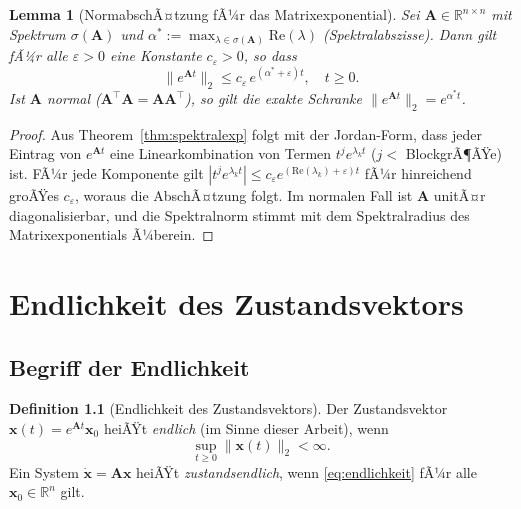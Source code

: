 ﻿\documentclass[12pt, a4paper, titlepage]{report}
\newtheorem{lemma}[theorem]{Lemma}
\theoremstyle{definition}
\newtheorem{definition}[theorem]{Definition}
\theoremstyle{remark}
\newcommand{\R}{\mathbb{R}}
\newcommand{\vx}{\bm{x}}
\newcommand{\vA}{\bm{A}}
\newcommand{\T}{\top}
\newcommand{\spec}{\sigma}
\newcommand{\re}{\mathrm{Re}}
\begin{document}
\begin{lemma}[NormabschÃ¤tzung fÃ¼r das Matrixexponential]
\label{lem:normbound}
Sei $\vA \in \R^{n \times n}$ mit Spektrum $\spec(\vA)$ und
$\alpha^* := \max_{\lambda \in \spec(\vA)} \re(\lambda)$ (Spektralabszisse).
Dann gilt fÃ¼r alle $\varepsilon > 0$ eine Konstante $c_\varepsilon > 0$, so dass
\begin{equation}
  \|e^{\vA t}\|_2 \leq c_\varepsilon\, e^{(\alpha^* + \varepsilon)t}, \quad t \geq 0.
  \label{eq:normbound}
\end{equation}
Ist $\vA$ normal ($\vA^\T\vA = \vA\vA^\T$), so gilt die exakte Schranke
$\|e^{\vA t}\|_2 = e^{\alpha^* t}$.
\end{lemma}

\begin{proof}
Aus Theorem~\ref{thm:spektralexp} folgt mit der Jordan-Form, dass jeder Eintrag von
$e^{\vA t}$ eine Linearkombination von Termen $t^j e^{\lambda_k t}$ ($j < $ BlockgrÃ¶ÃŸe)
ist. FÃ¼r jede Komponente gilt $|t^j e^{\lambda_k t}| \leq c_\varepsilon e^{(\re(\lambda_k)+\varepsilon)t}$
fÃ¼r hinreichend groÃŸes $c_\varepsilon$, woraus die AbschÃ¤tzung folgt. Im normalen Fall
ist $\vA$ unitÃ¤r diagonalisierbar, und die Spektralnorm stimmt mit dem Spektralradius
des Matrixexponentials Ã¼berein. \qedhere
\end{proof}

\chapter{Endlichkeit des Zustandsvektors}
\label{sec:endlichkeit}

\section{Begriff der Endlichkeit}

\begin{definition}[Endlichkeit des Zustandsvektors]
\label{def:endlichkeit}
Der Zustandsvektor $\vx(t) = e^{\vA t}\vx_0$ heiÃŸt \emph{endlich} (im Sinne dieser
Arbeit), wenn
\begin{equation}
  \sup_{t \geq 0} \|\vx(t)\|_2 < \infty.
  \label{eq:endlichkeit}
\end{equation}
Ein System $\dot{\vx} = \vA\vx$ heiÃŸt \emph{zustandsendlich}, wenn
\eqref{eq:endlichkeit} fÃ¼r alle $\vx_0 \in \R^n$ gilt.
\end{definition}
\end{document}

